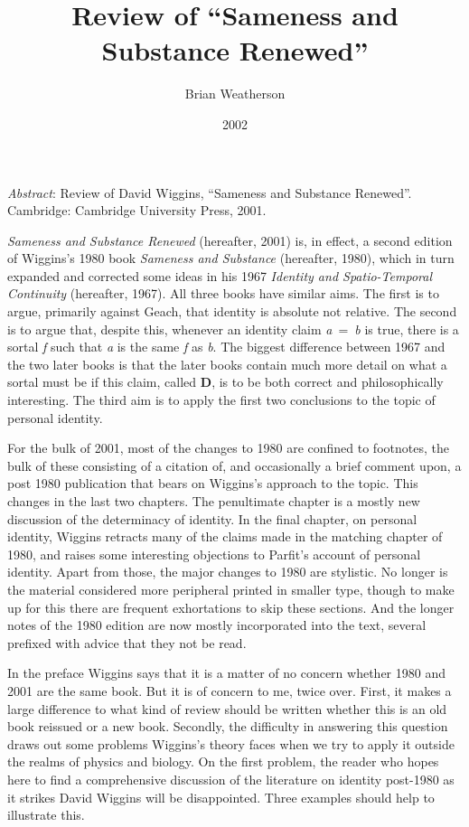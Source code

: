 \documentclass[
  11pt,
  letterpaper,
  DIV=11,
  numbers=noendperiod,
  twoside]{scrartcl}
\title{Review of ``Sameness and Substance Renewed''}
\author{Brian Weatherson}
\date{2002}
\renewenvironment{abstract}
 {\vspace{-1.25cm}
 \quotation\small\noindent\emph{Abstract}:}
 {\endquotation}
\begin{document}
\maketitle
\begin{abstract}
Review of David Wiggins, ``Sameness and Substance Renewed''. Cambridge:
Cambridge University Press, 2001.
\end{abstract}


\emph{Sameness and Substance Renewed} (hereafter, 2001) is, in effect, a
second edition of Wiggins's 1980 book \emph{Sameness and Substance}
(hereafter, 1980), which in turn expanded and corrected some ideas in
his 1967 \emph{Identity and Spatio-Temporal Continuity} (hereafter,
1967). All three books have similar aims. The first is to argue,
primarily against Geach, that identity is absolute not relative. The
second is to argue that, despite this, whenever an identity claim
\emph{a}~=~\emph{b} is true, there is a sortal \emph{f} such that
\emph{a} is the same \emph{f} as \emph{b}. The biggest difference
between 1967 and the two later books is that the later books contain
much more detail on what a sortal must be if this claim, called
\textbf{D}, is to be both correct and philosophically interesting. The
third aim is to apply the first two conclusions to the topic of personal
identity.

For the bulk of 2001, most of the changes to 1980 are confined to
footnotes, the bulk of these consisting of a citation of, and
occasionally a brief comment upon, a post 1980 publication that bears on
Wiggins's approach to the topic. This changes in the last two chapters.
The penultimate chapter is a mostly new discussion of the determinacy of
identity. In the final chapter, on personal identity, Wiggins retracts
many of the claims made in the matching chapter of 1980, and raises some
interesting objections to Parfit's account of personal identity. Apart
from those, the major changes to 1980 are stylistic. No longer is the
material considered more peripheral printed in smaller type, though to
make up for this there are frequent exhortations to skip these sections.
And the longer notes of the 1980 edition are now mostly incorporated
into the text, several prefixed with advice that they not be read.

In the preface Wiggins says that it is a matter of no concern whether
1980 and 2001 are the same book. But it is of concern to me, twice over.
First, it makes a large difference to what kind of review should be
written whether this is an old book reissued or a new book. Secondly,
the difficulty in answering this question draws out some problems
Wiggins's theory faces when we try to apply it outside the realms of
physics and biology. On the first problem, the reader who hopes here to
find a comprehensive discussion of the literature on identity post-1980
as it strikes David Wiggins will be disappointed. Three examples should
help to illustrate this.
\end{document}
